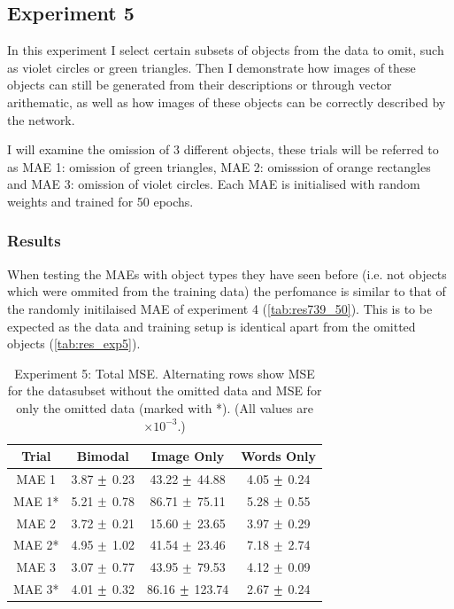\subsection{Experiment 5}
In this experiment I select certain subsets of objects from the data to omit, such as violet circles or green triangles. Then I demonstrate how images of these objects can still be generated from their descriptions or through vector arithematic, as well as how images of these objects can be correctly described by the network.

I will examine the omission of 3 different objects, these trials will be referred to as MAE 1: omission of green triangles, MAE 2: omisssion of orange rectangles and MAE 3: omission of  violet circles. Each MAE is initialised with random weights and trained for 50 epochs.

\subsubsection{Results}

When testing the \acp{MAE} with object types they have seen before (i.e. not objects which were ommited from the training data) the perfomance is similar to that of the randomly initilaised \ac{MAE} of experiment 4 (\autoref{tab:res739_50}). This is to be expected as the data and training setup is identical apart from the omitted objects (\autoref{tab:res_exp5}).

\begin{table}[h!]
\centering
	\begin{tabular}{|c|c|c|c|}
	\hline
\textbf{Trial} & 	\textbf{Bimodal} & 	\textbf{Image Only} 	& 	\textbf{Words Only} \\ \hline
MAE 1	&	3.87	$\mypm$	0.23	&	43.22	$\mypm$	44.88	&	4.05	$\mypm$	0.24	\\ \hline
MAE 1*	&	5.21	$\mypm$	0.78	&	86.71	$\mypm$	75.11	&	5.28	$\mypm$	0.55	\\ \hline
MAE 2	&	3.72	$\mypm$	0.21	&	15.60	$\mypm$	23.65	&	3.97	$\mypm$	0.29	\\ \hline
MAE 2*	&	4.95	$\mypm$	1.02	&	41.54	$\mypm$	23.46	&	7.18	$\mypm$	2.74	\\ \hline
MAE 3	&	3.07	$\mypm$	0.77 	&	43.95	$\mypm$	79.53	&	4.12	$\mypm$	0.09	\\ \hline
MAE 3*	&	4.01	$\mypm$	0.32	&	86.16	$\mypm$	123.74	&	2.67	$\mypm$	0.24	\\ \hline
\end{tabular}
\caption{Experiment 5: Total MSE. Alternating rows show MSE for the datasubset without the omitted data and MSE for only the omitted data (marked with *). (All values are $\times10^{-3}$.)}
\label{tab:res_exp5}
\end{table}

